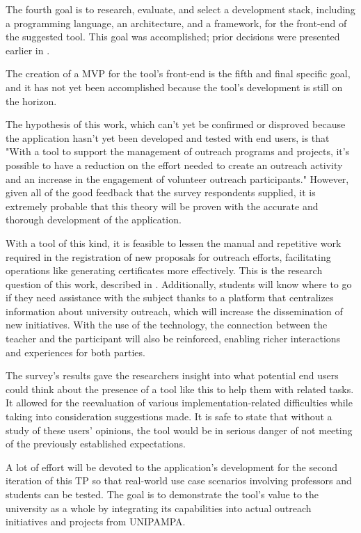 The fourth goal is to research, evaluate, and select a development stack, including a programming language, an architecture, and a framework, for the front-end of the suggested tool. This goal was accomplished; prior decisions were presented earlier in .

The creation of a \ac{MVP} for the tool's front-end is the fifth and final specific goal, and it has not yet been accomplished because the tool's development is still on the horizon.

The hypothesis of this work, which can't yet be confirmed or disproved because the application hasn't yet been developed and tested with end users, is that "With a tool to support the management of outreach programs and projects, it's possible to have a reduction on the effort needed to create an outreach activity and an increase in the engagement of volunteer outreach participants." However, given all of the good feedback that the survey respondents supplied, it is extremely probable that this theory will be proven with the accurate and thorough development of the application.

With a tool of this kind, it is feasible to lessen the manual and repetitive work required in the registration of new proposals for outreach efforts, facilitating operations like generating certificates more effectively. This is the research question of this work, described in . Additionally, students will know where to go if they need assistance with the subject thanks to a platform that centralizes information about university outreach, which will increase the dissemination of new initiatives. With the use of the technology, the connection between the teacher and the participant will also be reinforced, enabling richer interactions and experiences for both parties.

The survey's results gave the researchers insight into what potential end users could think about the presence of a tool like this to help them with related tasks. It allowed for the reevaluation of various implementation-related difficulties while taking into consideration suggestions made. It is safe to state that without a study of these users' opinions, the tool would be in serious danger of not meeting of the previously established expectations.

A lot of effort will be devoted to the application's development for the second iteration of this \ac{TP} so that real-world use case scenarios involving professors and students can be tested. The goal is to demonstrate the tool's value to the university as a whole by integrating its capabilities into actual outreach initiatives and projects from \ac{UNIPAMPA}.